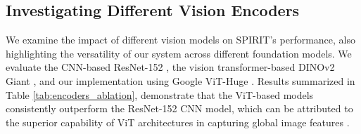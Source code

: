 



\subsection{Investigating Different Vision Encoders}
We examine the impact of different vision models on SPIRIT's performance, also highlighting the versatility of our system across different foundation models. We evaluate the CNN-based ResNet-152 \cite{resnet}, the vision transformer-based DINOv2 Giant \cite{dinov2}, and our implementation using Google ViT-Huge \cite{google_vit}. Results summarized in Table \ref{tab:encoders_ablation}, demonstrate that the ViT-based models consistently outperform the ResNet-152 CNN model, which can be attributed to the superior capability of ViT architectures in capturing global image features \cite{vits_gt_cnns1}.



